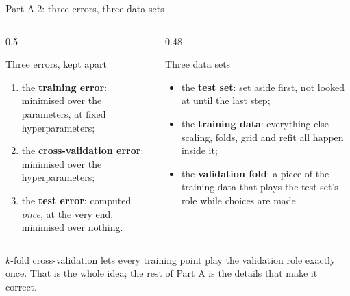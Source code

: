 \documentclass[10pt,aspectratio=169]{beamer}
\begin{document}
\begin{frame}{Part A.2: three errors, three data sets}
\small
\begin{columns}[T]
\begin{column}{0.5\textwidth}
\begin{block}{Three errors, kept apart}
\begin{enumerate}
  \item the \textbf{training error}: minimised over the parameters, at
        fixed hyperparameters;
  \item the \textbf{cross-validation error}: minimised over the
        hyperparameters;
  \item the \textbf{test error}: computed \emph{once}, at the very end,
        minimised over nothing.
\end{enumerate}
\end{block}
\end{column}
\begin{column}{0.48\textwidth}
\begin{block}{Three data sets}
\begin{itemize}
  \item the \textbf{test set}: set aside first, not looked at until the
        last step;
  \item the \textbf{training data}: everything else -- scaling, folds,
        grid and refit all happen inside it;
  \item the \textbf{validation fold}: a piece of the training data that
        plays the test set's role while choices are made.
\end{itemize}
\end{block}
\end{column}
\end{columns}
\medskip
$k$-fold cross-validation lets every training point play the validation
role exactly once.  That is the whole idea; the rest of Part A is the
details that make it correct.
\end{frame}
\end{document}
